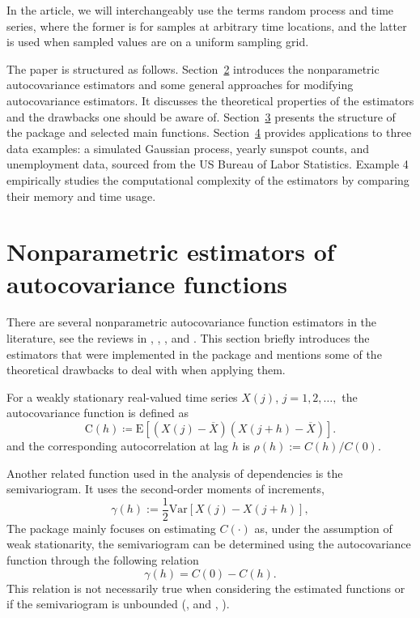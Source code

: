In the article, we will interchangeably use the terms random process and time series, where the former is for samples at arbitrary time locations, and the latter is used when sampled values are on a uniform sampling grid.

The paper is structured as follows. Section~\hyperref[sec:nonparametric]{2} introduces the nonparametric autocovariance estimators and some general approaches for modifying autocovariance estimators. It discusses the theoretical properties of the estimators and the drawbacks one should be aware of. Section~\hyperref[sec:overview]{3} presents the structure of the package and selected main functions. Section~\hyperref[sec:examples]{4} provides applications to three data examples: a simulated Gaussian process, yearly sunspot counts, and unemployment data, sourced from the US Bureau of Labor Statistics. Example 4 empirically studies the computational complexity of the estimators by comparing their memory and time usage.

\section{Nonparametric estimators of autocovariance functions}\label{sec:nonparametric}
There are several nonparametric autocovariance function estimators in the literature, see the reviews in \citet[Chapter~2.4]{Cressie1993}, \citet{hall1994_2}, \citet{cuevas2013study}, \citet{Durre2015} and \citet{Bilchouris_Olenko_2025}. 
This section briefly introduces the estimators that were implemented in the package and mentions some of the theoretical drawbacks to deal with when applying them.

For a weakly stationary real-valued time series \(X(j)\), \(j = 1, 2, \dots , \) the autocovariance function is defined as 
\[
\text{C}(h) \coloneq \text{E}\left[\left(X(j) - \overline{X}\right)\left(X(j + h) - \overline{X}\right)\right].
\]
and the corresponding autocorrelation at lag \(h\) is \(\rho(h):=C(h)/C(0).\)

Another related function used in the analysis of dependencies is the semivariogram. It uses the second-order moments of increments,
\[
\gamma(h) := \frac{1}{2} \text{Var}\left[X(j) - X(j + h) \right]  ,
\]
The package  mainly focuses on estimating \(C(\cdot)\) as, under the assumption of weak stationarity, the semivariogram can be determined using the autocovariance function through the following relation
\begin{equation} \label{eqn:variogram}
    \gamma(h) = C(0) - C(h).
\end{equation}
This relation is not necessarily true when considering the estimated functions or if the semivariogram is unbounded (\citeauthor{Chils2012}, \citeyear{Chils2012} and \citeauthor{Bilchouris_Olenko_2025}, \citeyear{Bilchouris_Olenko_2025}).


